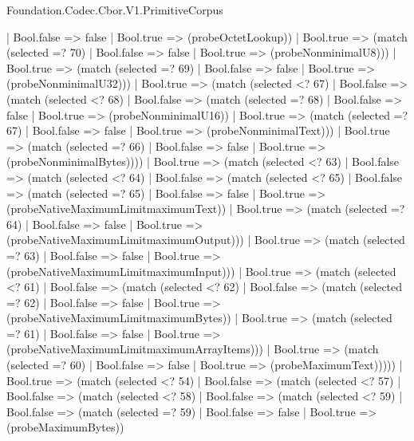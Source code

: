 \begin{lexlean}{Foundation.Codec.Cbor.V1.PrimitiveCorpus}
\begin{semanticmodule}
{                    | Bool.false => false
                    | Bool.true => (probeOctetLookup))
                  | Bool.true => (match (selected =? 70)
                    | Bool.false => false
                    | Bool.true => (probeNonminimalU8)))
                | Bool.true => (match (selected =? 69)
                  | Bool.false => false
                  | Bool.true => (probeNonminimalU32)))
              | Bool.true => (match (selected <? 67)
                | Bool.false => (match (selected <? 68)
                  | Bool.false => (match (selected =? 68)
                    | Bool.false => false
                    | Bool.true => (probeNonminimalU16))
                  | Bool.true => (match (selected =? 67)
                    | Bool.false => false
                    | Bool.true => (probeNonminimalText)))
                | Bool.true => (match (selected =? 66)
                  | Bool.false => false
                  | Bool.true => (probeNonminimalBytes))))
            | Bool.true => (match (selected <? 63)
              | Bool.false => (match (selected <? 64)
                | Bool.false => (match (selected <? 65)
                  | Bool.false => (match (selected =? 65)
                    | Bool.false => false
                    | Bool.true => (probeNativeMaximumLimitmaximumText))
                  | Bool.true => (match (selected =? 64)
                    | Bool.false => false
                    | Bool.true => (probeNativeMaximumLimitmaximumOutput)))
                | Bool.true => (match (selected =? 63)
                  | Bool.false => false
                  | Bool.true => (probeNativeMaximumLimitmaximumInput)))
              | Bool.true => (match (selected <? 61)
                | Bool.false => (match (selected <? 62)
                  | Bool.false => (match (selected =? 62)
                    | Bool.false => false
                    | Bool.true => (probeNativeMaximumLimitmaximumBytes))
                  | Bool.true => (match (selected =? 61)
                    | Bool.false => false
                    | Bool.true => (probeNativeMaximumLimitmaximumArrayItems)))
                | Bool.true => (match (selected =? 60)
                  | Bool.false => false
                  | Bool.true => (probeMaximumText)))))
          | Bool.true => (match (selected <? 54)
            | Bool.false => (match (selected <? 57)
              | Bool.false => (match (selected <? 58)
                | Bool.false => (match (selected <? 59)
                  | Bool.false => (match (selected =? 59)
                    | Bool.false => false
                    | Bool.true => (probeMaximumBytes))
}
\end{semanticmodule}
\end{lexlean}
